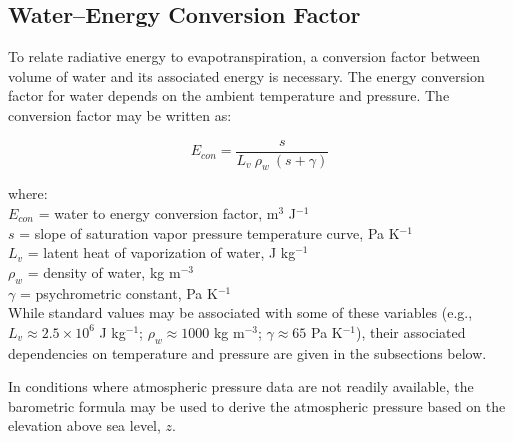 \subsection{Water--Energy Conversion Factor}
\label{sec:econ}
To relate radiative energy to evapotranspiration, a conversion factor between volume of water and its associated energy is necessary. 
The energy conversion factor for water depends on the ambient temperature and pressure. The conversion factor may be written as:

\begin{equation}
\label{eq:econ}
	E_{con} = \frac{s}{L_v\: \rho_w\: \left( s + \gamma \right)}
\end{equation}

\noindent where: \\
\indent $E_{con}$ = water to energy conversion factor, m$^{3}$ J$^{-1}$\\
\indent $s$ = slope of saturation vapor pressure temperature curve, Pa K$^{-1}$ \\
\indent $L_v$ = latent heat of vaporization of water, J kg$^{-1}$\\
\indent $\rho_w$ = density of water, kg m$^{-3}$\\
\indent $\gamma$ = psychrometric constant, Pa K$^{-1}$ \\

\noindent While standard values may be associated with some of these variables (e.g., $L_v \approx 2.5\times 10^6$ J kg$^{-1}$; $\rho_w \approx 1000$ kg m$^{-3}$; $\gamma \approx 65$ Pa K$^{-1}$), their associated dependencies on temperature and pressure are given in the subsections below.

In conditions where atmospheric pressure data are not readily available, the barometric formula may be used to derive the atmospheric pressure based on the elevation above sea level, $z$.

